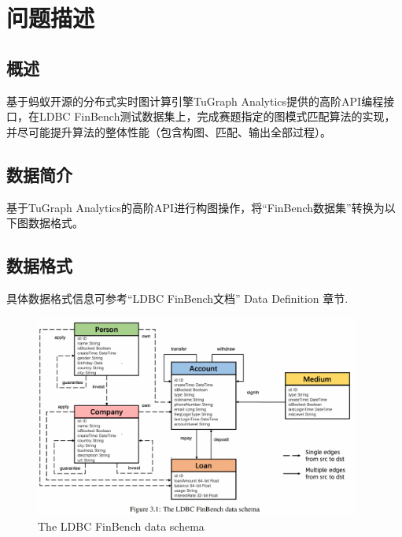 \section{问题描述}
\subsection{概述}
基于蚂蚁开源的分布式实时图计算引擎TuGraph Analytics提供的⾼阶API编程接口，在LDBC FinBench测试数据集上，完成赛题指定的图模式匹配算法的实现，并尽可能提升算法的整体性能（包含构图、匹配、输出全部过程）。

\subsection{数据简介}
基于TuGraph Analytics的高阶API进行构图操作，将``FinBench数据集''转换为以下图数据格式。

\subsection{数据格式}
具体数据格式信息可参考``LDBC FinBench文档''\cite{ref3} Data Definition 章节.

\begin{figure}[H]
  \begin{center}
    \includegraphics[width=0.95\textwidth]{./figures/蚂蚁2-1-728694.png}
  \end{center}
  \caption{The LDBC FinBench data schema}
\end{figure}

